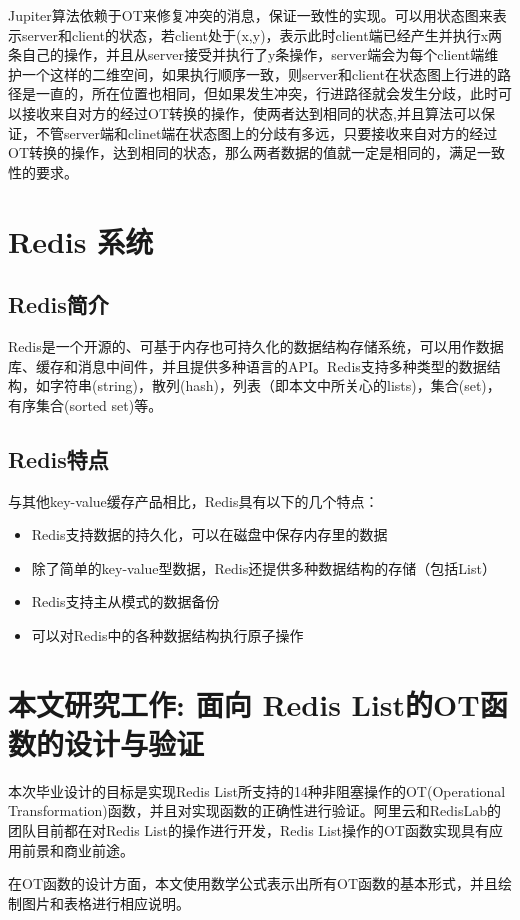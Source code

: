 Jupiter算法依赖于OT来修复冲突的消息，保证一致性的实现。可以用状态图来表示server和client的状态，若client处于(x,y)，表示此时client端已经产生并执行x两条自己的操作，并且从server接受并执行了y条操作，server端会为每个client端维护一个这样的二维空间，如果执行顺序一致，则server和client在状态图上行进的路径是一直的，所在位置也相同，但如果发生冲突，行进路径就会发生分歧，此时可以接收来自对方的经过OT转换的操作，使两者达到相同的状态,并且算法可以保证，不管server端和clinet端在状态图上的分歧有多远，只要接收来自对方的经过OT转换的操作，达到相同的状态，那么两者数据的值就一定是相同的，满足一致性的要求。

\section{Redis 系统}
\subsection{Redis简介}
Redis是一个开源的、可基于内存也可持久化的数据结构存储系统，可以用作数据库、缓存和消息中间件，并且提供多种语言的API。Redis支持多种类型的数据结构，如字符串(string)，散列(hash)，列表（即本文中所关心的lists)，集合(set)，有序集合(sorted set)等。
\subsection{Redis特点}
与其他key-value缓存产品相比，Redis具有以下的几个特点：
\begin{itemize}
\item Redis支持数据的持久化，可以在磁盘中保存内存里的数据
\item 除了简单的key-value型数据，Redis还提供多种数据结构的存储（包括List）
\item Redis支持主从模式的数据备份
\item 可以对Redis中的各种数据结构执行原子操作
\end{itemize}
\section{本文研究工作: 面向 Redis List的OT函数的设计与验证}
	\par 本次毕业设计的目标是实现Redis List所支持的14种非阻塞操作的OT(Operational Transformation)函数，并且对实现函数的正确性进行验证。阿里云和RedisLab的团队目前都在对Redis List的操作进行开发，Redis List操作的OT函数实现具有应用前景和商业前途。

	\par 在OT函数的设计方面，本文使用数学公式表示出所有OT函数的基本形式，并且绘制图片和表格进行相应说明。

